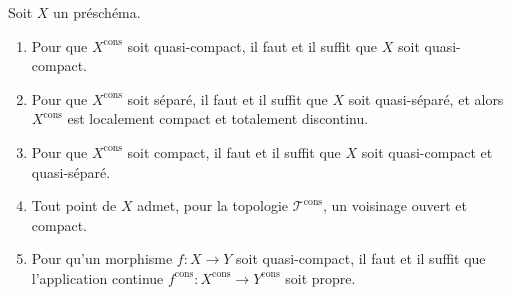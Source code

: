 \begin{proposition}[1.9.15]
\label{IV.1.9.15-fr}
Soit $X$ un préschéma.
\begin{enumerate}
  \item[(i)] Pour que $X^{\mathrm{cons}}$ soit quasi-compact, il faut et il
  suffit que $X$ soit quasi-compact.
  \item[(ii)] Pour que $X^{\mathrm{cons}}$ soit séparé, il faut et il suffit
  que $X$ soit quasi-séparé, et alors $X^{\mathrm{cons}}$ est localement
  compact et totalement discontinu.
  \item[(iii)] Pour que $X^{\mathrm{cons}}$ soit compact, il faut et il suffit
  que $X$ soit quasi-compact et quasi-séparé.
  \item[(iv)] Tout point de $X$ admet, pour la topologie
  $\mathscr T^{\mathrm{cons}}$, un voisinage ouvert et compact.
  \item[(v)] Pour qu'un morphisme $f:X\to Y$ soit quasi-compact, il faut et il
  suffit que l'application continue
  $f^{\mathrm{cons}}:X^{\mathrm{cons}}\to Y^{\mathrm{cons}}$ soit propre.
\end{enumerate}
\end{proposition}

